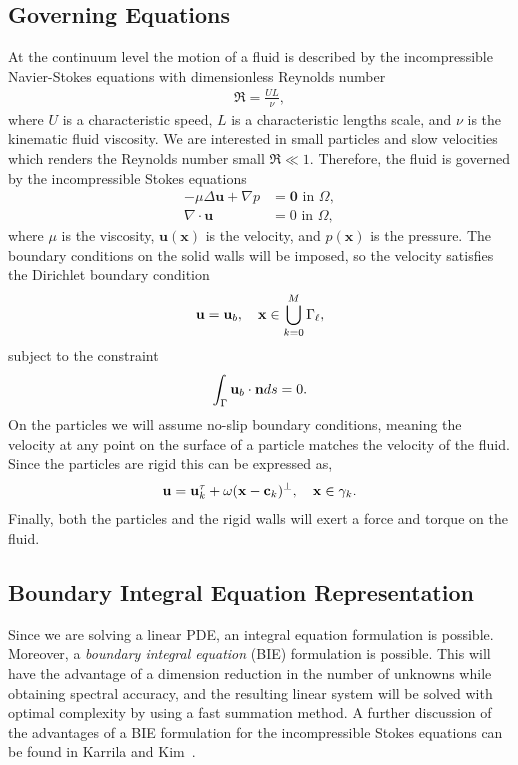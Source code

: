 \documentclass[preprint, 10pt]{elsarticle}
\begin{document}
\subsection{Governing Equations}\label{sec:governing}
At the continuum level the motion of a fluid is described by the
incompressible Navier-Stokes equations with dimensionless Reynolds
number
\begin{align*}
  \Re = \frac{UL}{\nu},
\end{align*}
where $U$ is a characteristic speed, $L$ is a characteristic lengths
scale, and $\nu$ is the kinematic fluid viscosity.  We are interested in
small particles and slow velocities which renders the Reynolds number
small $\Re \ll 1$.  Therefore, the fluid is governed by the
incompressible Stokes equations
\begin{subequations}\label{eq:stokes}
\begin{align}
  -\mu\Delta \mathbf{u} + \nabla p &= \mathbf{0} \text{ in }\Omega,\\	  
  \nabla\cdot\mathbf{u} &= 0 \text{ in }\Omega,
\end{align}
\end{subequations}
where $\mu$ is the viscosity, $\mathbf{u}(\mathbf{x})$ is the velocity,
and $p(\mathbf{x})$ is the pressure.  The boundary conditions on the
solid walls will be imposed, so the velocity satisfies the Dirichlet
boundary condition
\begin{align}
  \label{eq:boundary_condition}
  \mathbf{u} = \mathbf{u}_b, \quad {\mathbf{x}} \in 
    \bigcup\limits_{k=0}^M \Gamma_\ell,
\end{align}
subject to the constraint 
\begin{align}
  \label{eq:compatibility}
  \int_{\Gamma} {\mathbf{u}}_b\cdot{\mathbf{n}} ds = 0.
\end{align}
On the particles we will assume no-slip boundary conditions, meaning the
velocity at any point on the surface of a particle matches the velocity
of the fluid.  Since the particles are rigid this can be expressed as,
\begin{align*}
  {\mathbf{u}} = {\mathbf{u}}^\tau_k + \omega({\mathbf{x}}-{\mathbf{c}}_k)^\perp, \quad {\mathbf{x}} \in \gamma_k.
\end{align*}
Finally, both the particles and the rigid walls will exert a force and
torque on the fluid. 


\subsection{Boundary Integral Equation Representation}
Since we are solving a linear PDE, an integral equation formulation is
possible.  Moreover, a {\em boundary integral equation} (BIE)
formulation is possible.  This will have the advantage of a dimension
reduction in the number of unknowns while obtaining spectral accuracy,
and the resulting linear system will be solved with optimal complexity
by using a fast summation method.  A further discussion of the
advantages of a BIE formulation for the incompressible Stokes equations
can be found in Karrila and Kim~\cite{Karrila1989}.
\end{document}
